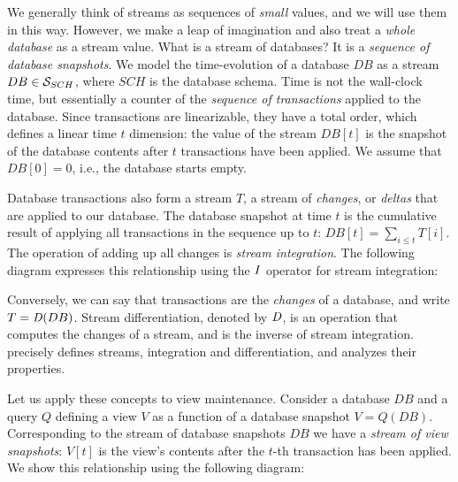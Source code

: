 We generally think of streams as sequences of \emph{small} values,
and we will use them in this way.
However, we make a leap of imagination and also treat a \emph{whole database} as a stream value.
What is a stream of databases?  It is a \emph{sequence of database
snapshots}.  We model the time-evolution of a database $DB$ as a
stream $DB \in \mathcal{S}_{SCH}$, where $SCH$ is the database schema.
Time is not the wall-clock time, but essentially a counter
of the \emph{sequence of transactions} applied to the database. 
Since transactions are linearizable,
they have a total order, which defines a linear time $t$ dimension:
the value of the stream $DB[t]$ is the snapshot of the 
database contents after $t$ transactions have been applied.  We assume
that $DB[0] = 0$, i.e., the database starts empty.

Database transactions also form a stream $T$, a stream of \emph{changes},
or \emph{deltas} that are applied to our database.   
The database snapshot at time $t$ is the cumulative result of applying all 
transactions in the sequence up to $t$: $DB[t] = \sum_{i \leq t} T[i]$.
The operation of adding up all changes is \emph{stream integration}.
The following diagram expresses this relationship using the $\mathit{I}$ operator for 
stream integration:

\begin{center}
\end{center}

Conversely, we can say that transactions are the \emph{changes} of a database, and write
$T = \mathit{D}(DB)$.  Stream differentiation, denoted by $\mathit{D}$, 
is an operation that computes the changes of a stream, and is the 
inverse of stream integration.  
precisely defines streams, integration and differentiation, and analyzes
their properties. 

Let us apply these concepts to view maintenance.
Consider a database $DB$ and a query $Q$ defining a view $V$ as a function
of a database snapshot $V = Q(DB)$.  Corresponding to the stream of database snapshots
$DB$ we have a \emph{stream of view snapshots}: $V[t]$ is the
view's contents after the $t$-th transaction has been applied.  We show this
relationship using the following diagram:

